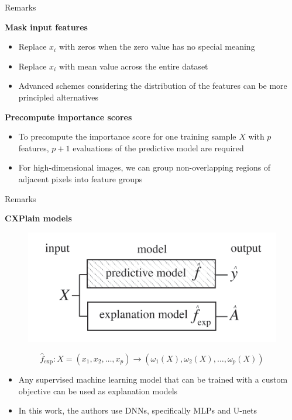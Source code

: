 \documentclass[10pt]{beamer}
\begin{document}
\begin{frame}{Remarks}

\textbf{Mask input features}
\begin{itemize}
\item Replace $x_i $ with zeros when the zero value has no special meaning
\item Replace $x_i $ with mean value across the entire dataset
\item Advanced schemes considering the distribution of the features can be more principled alternatives
\end{itemize}

\textbf{Precompute importance scores}
\begin{itemize}
\item To precompute the importance score for one training sample $X$ with $p$ features, $p+1$ evaluations of the predictive model are required
\item For high-dimensional images, we can group non-overlapping regions of adjacent pixels into feature groups
\end{itemize}
\end{frame}

\begin{frame}{Remarks}

\textbf{CXPlain models}
\begin{figure}
\centering
\includegraphics[width=.5\textwidth]{figures/methodology/model structure.png}
\end{figure}

\begin{equation}
\hat{f}_{\exp}: X = (x_1, x_2, \hdots, x_p) \to (\omega_1(X), \omega_2(X), \hdots, \omega_p(X))
\end{equation}

\begin{itemize}
\item Any supervised machine learning model that can be trained with a custom objective can be used as explanation models
\item In this work, the authors use DNNs, specifically MLPs and U-nets
\end{itemize}
\end{frame}
\end{document}

